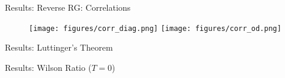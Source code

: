 \documentclass[aspectratio=169]{beamer}
\begin{document}
\begin{frame}{Results: Reverse RG: Correlations}
	\begin{figure}[htpb]
		\centering
		\texttt{[image: figures/corr\_diag.png]}\hspace*{\fill}
		\texttt{[image: figures/corr\_od.png]}
	\end{figure}
\end{frame}

\begin{frame}{Results: Luttinger's Theorem}
	
\end{frame}

\begin{frame}{Results: Wilson Ratio (\(T=0\))}
	
\end{frame}

\end{document}
